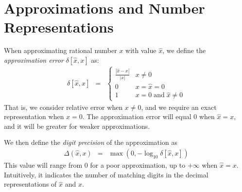 \documentclass[letterpaper,USenglish,cleveref, autoref, thm-restate]{lipics-v2021}
\newcommand{\approximate}[1]{\hat{#1}}
\newcommand{\approxx}{\approximate{x}}
\newcommand{\aerror}{\delta}
\newcommand{\digitprecision}{\Delta}
\begin{document}
\section{Approximations and Number Representations}
\label{sect:background:numbers}

When approximating rational number $x$ with value $\approximate{x}$, we
define the \emph{approximation error} $\aerror[\approxx, x]$ as:
\begin{eqnarray}
\aerror[\approxx, x] & = & \left\{ \begin{array}{ll}
  \frac{|\approxx - x|}{|x|}  & x \not = 0\\
  0 & x  = \approxx = 0\\
  1 & x = 0 \; \textrm{and} \; \approxx \not = 0
  \end{array} \right. \label{eqn:approx:error}
\end{eqnarray}
That is, we consider relative error when $x \not = 0$, and we require an exact representation when $x = 0$.
The approximation error will equal 0 when $\approxx=x$, and it will be greater for weaker approximations.

We then define the \emph{digit precision} of the approximation as
\begin{eqnarray}
\digitprecision(\approxx, x) & = & \max(0, -\log_{10} \aerror[\approxx, x]) \label{eqn:digitprecision} 
\end{eqnarray}
This value will range from $0$ for a poor approximation, up to $+\infty$ when $\approxx=x$.
Intuitively, it indicates the number of matching digits in the decimal representations of $\approxx$ and $x$.
\end{document}
